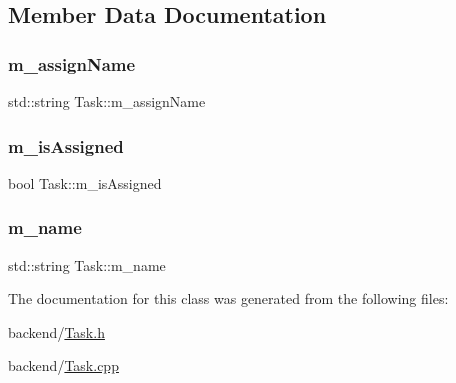 \subsection{Member Data Documentation}
\mbox{\label{class_task_abc9f42fa1d9fae58b195f88b7c4688bc}} 
\subsubsection{\texorpdfstring{m\+\_\+assign\+Name}{m\_assignName}}
{\footnotesize\ttfamily std\+::string Task\+::m\+\_\+assign\+Name}

\mbox{\label{class_task_a171b8b24c985174d1a5ba64f4bc02b85}} 
\subsubsection{\texorpdfstring{m\+\_\+is\+Assigned}{m\_isAssigned}}
{\footnotesize\ttfamily bool Task\+::m\+\_\+is\+Assigned}

\mbox{\label{class_task_a0676177367cd081021726d78f070e083}} 
\subsubsection{\texorpdfstring{m\+\_\+name}{m\_name}}
{\footnotesize\ttfamily std\+::string Task\+::m\+\_\+name}



The documentation for this class was generated from the following files\+:\begin{DoxyCompactItemize}
\item 
backend/\mbox{\hyperlink{_task_8h}{Task.\+h}}\item 
backend/\mbox{\hyperlink{_task_8cpp}{Task.\+cpp}}\end{DoxyCompactItemize}

